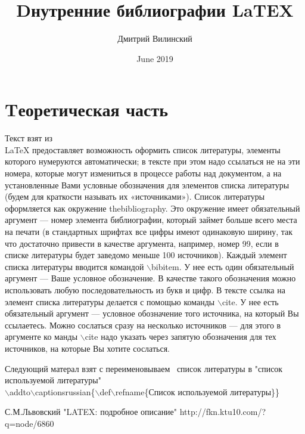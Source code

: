 \documentclass{article}
\title{Dнутренние библиографии LaTEX}
\author{Дмитрий Вилинский}
\date{June 2019}
\begin{document}
\maketitle

\section{Tеоретическая часть}
Текст взят из \cite{Lat1}\\
\LaTeX{}  предоставляет возможность оформить список литературы, элементы которого нумеруются автоматически; в тексте при этом надо ссылаться не на эти номера, которые могут измениться в процессе работы над документом, а на установленные Вами условные обозначения для элементов списка литературы (будем для краткости называть их «источниками»).
Список литературы оформляется как окружение thebibliography. Это окружение имеет обязательный аргумент — номер элемента библиографии, который займет больше всего места на печати (в стандартных шрифтах все цифры имеют одинаковую ширину, так что достаточно привести в качестве аргумента, например, номер 99, если в списке литературы будет заведомо меньше 100 источников).
Каждый элемент списка литературы вводится командой $\backslash$bibitem. У нее есть один обязательный аргумент — Ваше условное обозначение. В качестве такого обозначения можно использовать любую последовательность из букв и цифр. В тексте ссылка на элемент списка литературы делается с помощью команды $\backslash$cite. У нее есть обязательный аргумент — условное обозначение того источника, на который Вы ссылаетесь. Можно сослаться сразу на несколько источников — для этого в аргументе ко
манды $\backslash$cite надо указать через запятую обозначения для тех источников, на которые Вы
хотите сослаться. 

Следующий матерал взят с  \cite{Lat2}
переименовываем  список литературы в "список используемой литературы"\\
$\backslash$addto$\backslash$captionsrussian\{$\backslash$def$\backslash$refname\{Список используемой литературы\}\}

\begin{thebibliography}{99}
 С.М.Львовский "LATEX: подробное описание"
 http://fkn.ktu10.com/?q=node/6860
\end{thebibliography}
\end{document}
